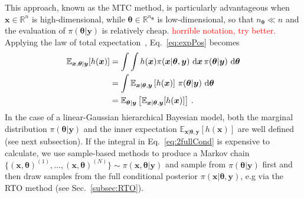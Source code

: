 This approach, known as the MTC method, is particularly advantageous when $\bm{x}\in \mathbb{R}^n$ is high-dimensional, while $\bm{\theta}\in \mathbb{R}^{n_{\bm{\theta}}}$ is low-dimensional, so that $n_{\bm{\theta}} \ll n$ and the evaluation of $\pi(\bm{\theta}| \bm{y})$ is relatively cheap. \textcolor{red}{horrible notation, try better.}
Applying the law of total expectation~\cite{champ2022generalizedlawtotalcovariance}, Eq.~\eqref{eq:expPos} becomes
\begin{align}
	\mathbb{E}_{\bm{x} ,\bm{\theta}  |\bm{y}} [h(\bm{x})] &= \int \int   h(\bm{x}) \pi(\bm{x} |  \bm{\theta}, \bm{y}) \, \mathop{}\!\mathrm{d} \bm{x} \,  \pi(\bm{\theta} |   \bm{y}) \, \mathop{}\!\mathrm{d} \bm{\theta} \\
	&= \int \mathbb{E}_{\bm{x} |  \bm{\theta}, \bm{y}} \left[ h(\bm{x}) \right] \, \pi(\bm{\theta} |  \bm{y}) \, \mathop{}\!\mathrm{d} \bm{\theta}\label{eq:2fullCond} \\
		&= \mathbb{E}_{\bm{\theta} |  \bm{y}} \left[ \mathbb{E}_{\bm{x} |  \bm{\theta}, \bm{y}} [h(\bm{x})] \right] \, .
	\label{eq:fullCond}
\end{align}
In the case of a linear-Gaussian hierarchical Bayesian model, both the marginal distribution $\pi (\bm{\theta}| \bm{y})$ %
and the inner expectation $\mathbb{E}_{\bm{x} |  \bm{\theta}, \bm{y}} \left[ h(\bm{x}) \right]$ are well defined (see next subsection).
If the integral in Eq.~\ref{eq:2fullCond} is expensive to calculate, we use sample-based methods to produce a Markov chain $\{ (\bm{x}, \bm{\theta})^{(1)}, \dots, (\bm{x}, \bm{\theta})^{(N)} \} \sim \pi(\bm{x}, \bm{\theta} |  \bm{y}) $ and sample from $\pi(\bm{\theta} |  \bm{y})$ first and then draw samples from the full conditional posterior $\pi(\bm{x} | \bm{\theta} , \bm{y})$, e.g via the RTO method (see Sec.~\ref{subsec:RTO}). 


